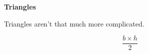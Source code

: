 \item{\textbf{Triangles}}

Triangles aren't that much more complicated.

$$ \frac{{b} \times {h}}{2} $$
